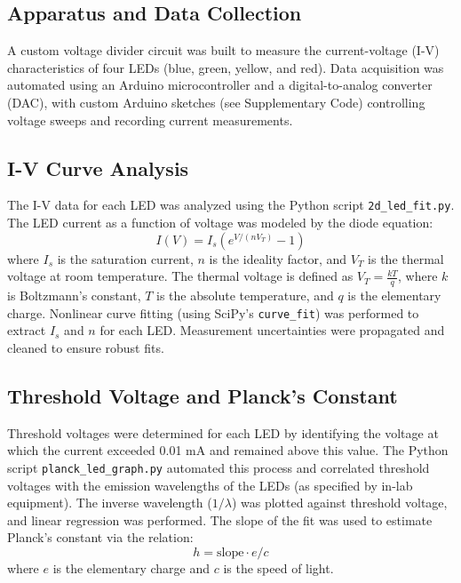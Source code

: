 \documentclass[12pt,a4paper]{article}
\begin{document}
\subsection{Apparatus and Data Collection}
A custom voltage divider circuit was built to measure the current-voltage (I-V) characteristics of four LEDs (blue, green, yellow, and red). Data acquisition was automated using an Arduino microcontroller and a digital-to-analog converter (DAC), with custom Arduino sketches (see Supplementary Code) controlling voltage sweeps and recording current measurements.

\subsection{I-V Curve Analysis}
The I-V data for each LED was analyzed using the Python script \texttt{2d\_led\_fit.py}. The LED current as a function of voltage was modeled by the diode equation:
\begin{equation}
I(V) = I_s \left( e^{V/(n V_T)} - 1 \right)
\end{equation}
where $I_s$ is the saturation current, $n$ is the ideality factor, and $V_T$ is the thermal voltage at room temperature. The thermal voltage is defined as $V_T = \frac{kT}{q}$, where $k$ is Boltzmann's constant, $T$ is the absolute temperature, and $q$ is the elementary charge. Nonlinear curve fitting (using SciPy’s \texttt{curve\_fit}) was performed to extract $I_s$ and $n$ for each LED. Measurement uncertainties were propagated and cleaned to ensure robust fits.

\subsection{Threshold Voltage and Planck’s Constant}
Threshold voltages were determined for each LED by identifying the voltage at which the current exceeded 0.01 mA and remained above this value. The Python script \texttt{planck\_led\_graph.py} automated this process and correlated threshold voltages with the emission wavelengths of the LEDs (as specified by in-lab equipment). The inverse wavelength ($1/\lambda$) was plotted against threshold voltage, and linear regression was performed. The slope of the fit was used to estimate Planck’s constant via the relation:
\begin{equation}
h = \text{slope} \cdot e / c
\end{equation}
where $e$ is the elementary charge and $c$ is the speed of light.
\end{document}
